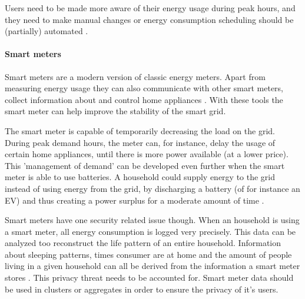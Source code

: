 Users need to be made more aware of their energy usage during peak hours, and they need to make manual changes \cite{Mohsenian-RadLeon-Garcia2010} or energy consumption scheduling should be (partially) automated  \cite{SamadiMohsenian-RadSchoberEtAl2012}.

\paragraph{Smart meters}

Smart meters are a modern version of classic energy meters. Apart from measuring energy usage they can also communicate with other smart meters, collect information about and control home appliances \cite{DepuruWangDevabhaktuni2011a}. With these tools the smart meter can help improve the stability of the smart grid.

The smart meter is capable of temporarily decreasing the load on the grid. During peak demand hours, the meter can, for instance, delay the usage of certain home appliances, until there is more power available (at a lower price). 
This 'management of demand' can be developed even further when the smart meter is able to use batteries. A household could supply energy to the grid instead of using energy from the grid, by discharging a battery (of for instance an EV) and thus creating a power surplus for a moderate amount of time \cite{MwasiluJustoKimEtAl2014}. 

Smart meters have one security related issue though. When an household is using a smart meter, all energy consumption is logged very precisely. This data can be analyzed too reconstruct the life pattern of an entire household. Information about sleeping patterns, times consumer are at home and the amount of people living in a given household can all be derived from the information a smart meter stores \cite{Molina-MarkhamShenoyFuEtAl2010}. This privacy threat needs to be accounted for. Smart meter data should be used in clusters or aggregates in order to ensure the privacy of it's users.

